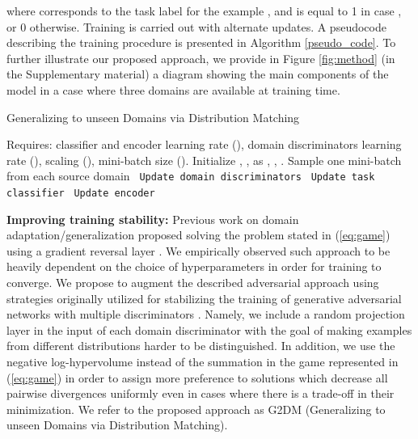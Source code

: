 \documentclass{article}
\begin{document}
where  corresponds to the task label for the example , and  is equal to 1 in case , or 0 otherwise. 
Training is carried out with alternate updates. A pseudocode describing the training procedure is presented in Algorithm \ref{pseudo_code}. To further illustrate our proposed approach, we provide in Figure \ref{fig:method} (in the Supplementary material) a diagram showing the main components of the model in a case where three domains are available at training time.

\begin{algorithm*}[h]
\caption{Generalizing to unseen Domains via Distribution Matching}\label{pseudo_code}
\begin{algorithmic}[1]
\STATE Requires: classifier and encoder learning rate (), domain discriminators learning rate (), scaling (), mini-batch size ().
\STATE Initialize , ,  as , , . 
\STATE Sample one mini-batch from each source domain 
\STATE \texttt{ Update domain discriminators}
\FOR {}
\STATE 
\ENDFOR
\STATE \texttt{ Update task classifier}
\STATE 
\STATE \texttt{ Update encoder}
\STATE   \\ 

\ENDFOR
\end{algorithmic}
\end{algorithm*}

\textbf{Improving training stability:} Previous work on domain adaptation/generalization \cite{ganin2016domain,li2018deep} proposed solving the problem stated in (\ref{eq:game}) using a gradient reversal layer \cite{ganin2015unsupervised}. We empirically observed such approach to be heavily dependent on the choice of hyperparameters in order for training to converge. We propose to augment the described adversarial approach using strategies originally utilized for stabilizing the training of generative adversarial networks with multiple discriminators \cite{neyshabur2017stabilizing, albuquerque2019multi}. Namely, we include a random projection layer in the input of each domain discriminator with the goal of making examples from different distributions harder to be distinguished. In addition, we use the negative log-hypervolume instead of the summation in the game represented in (\ref{eq:game}) in order to assign more preference to solutions which decrease all pairwise divergences uniformly even in cases where there is a trade-off in their minimization. We refer to the proposed approach as G2DM (Generalizing to unseen Domains via Distribution Matching).
\end{document}
